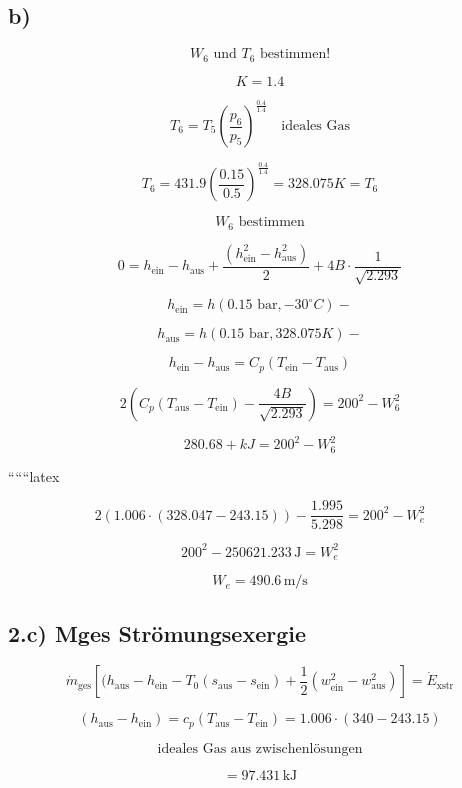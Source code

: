 

\subsection*{b)}

\[
W_6 \text{ und } T_6 \text{ bestimmen!}
\]

\[
K = 1.4
\]

\[
T_6 = T_5 \left( \frac{p_6}{p_5} \right)^{\frac{0.4}{1.4}} \quad \text{ideales Gas}
\]

\[
T_6 = 431.9 \left( \frac{0.15}{0.5} \right)^{\frac{0.4}{1.4}} = \boxed{328.075 K} = T_6
\]

\[
W_6 \text{ bestimmen}
\]

\[
0 = h_{\text{ein}} - h_{\text{aus}} + \frac{(h_{\text{ein}}^2 - h_{\text{aus}}^2)}{2} + 4B \cdot \frac{1}{\sqrt{2.293}}
\]


\[
h_{\text{ein}} = h(0.15 \text{ bar}, -30^\circ C) -
\]

\[
h_{\text{aus}} = h(0.15 \text{ bar}, 328.075 K) -
\]

\[
h_{\text{ein}} - h_{\text{aus}} = C_p (T_{\text{ein}} - T_{\text{aus}})
\]

\[
2 \left( C_p (T_{\text{aus}} - T_{\text{ein}}) - \frac{4B}{\sqrt{2.293}} \right) = 200^2 - W_6^2
\]

\[
280.68 + kJ = 200^2 - W_6^2
\]

``````latex


\[
2 \left( 1.006 \cdot (328.047 - 243.15) \right) - \frac{1.995}{5.298} = 200^2 - W_{e}^2
\]

\[
200^2 - 250621.233 \, \text{J} = W_{e}^2
\]

\[
W_{e} = 490.6 \, \text{m/s}
\]

\subsection*{2.c) Mges Strömungsexergie}

\[
\dot{m}_{\text{ges}} \left[ (h_{\text{aus}} - h_{\text{ein}} - T_0 (s_{\text{aus}} - s_{\text{ein}}) + \frac{1}{2} (w_{\text{ein}}^2 - w_{\text{aus}}^2) \right] = \dot{E}_{\text{xstr}}
\]

\[
(h_{\text{aus}} - h_{\text{ein}}) = c_p (T_{\text{aus}} - T_{\text{ein}}) = 1.006 \cdot (340 - 243.15)
\]

\[
\text{ideales Gas aus zwischenlösungen}
\]

\[
= 97.431 \, \text{kJ}
\]

